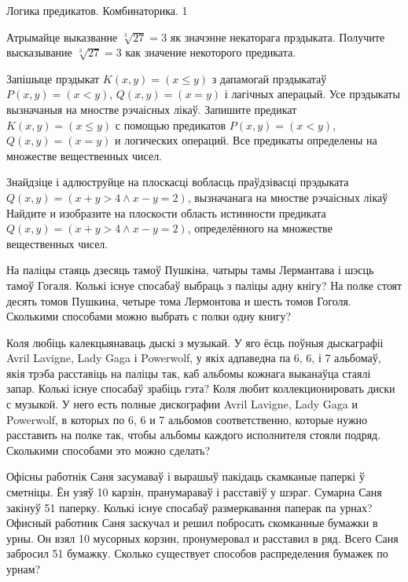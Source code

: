 



{Логика предикатов. Комбинаторика.}
{1}

\begin{problemList}

\problemItemSimple
{Атрымайце выказванне $\sqrt[3]{27} = 3$ як значэнне некаторага прэдыката.}
{Получите высказывание $\sqrt[3]{27} = 3$ как значение некоторого предиката.}

\bigskip

\problemItemSimple
{Запішыце прэдыкат $K(x, y) = (x \le y)$ з дапамогай прэдыкатаў $P(x, y) = (x < y)$, $Q(x, y) = (x = y)$ і лагічных аперацый.
Усе прэдыкаты вызначаныя на мностве рэчаісных лікаў. }
{Запишите предикат $K(x, y) = (x \le y)$ с помощью предикатов $P(x, y) = (x < y)$, $Q(x, y) = (x = y)$ и логических операций.
Все предикаты определены на множестве вещественных чисел.}

\bigskip

\problemItemSimple
{Знайдзіце і адлюструйце на плоскасці вобласць праўдзівасці прэдыката $Q(x, y) = (x + y > 4 \wedge x - y = 2)$, вызначанага на мностве рэчаісных лікаў}
{Найдите и изобразите на плоскости область истинности предиката $Q(x, y) = (x + y > 4 \wedge x - y = 2)$, определённого на множестве вещественных чисел.}

\bigskip

\problemItemSimple
{На паліцы стаяць дзесяць тамоў Пушкіна, чатыры тамы Лермантава і шэсць тамоў Гогаля.
Колькі існуе спосабаў выбраць з паліцы адну кнігу?}
{На полке стоят десять томов Пушкина, четыре тома Лермонтова и шесть томов Гоголя.
Сколькими способами можно выбрать с полки одну книгу?}

\bigskip

\problemItemSimple
{Коля любіць калекцыянаваць дыскі з музыкай.
У яго ёсць поўныя дыскаграфіі Avril Lavigne, Lady Gaga і Powerwolf, у якіх адпаведна па 6, 6, і 7 альбомаў,
якія трэба расставіць на паліцы так, каб альбомы кожнага выканаўца стаялі запар.
Колькі існуе спосабаў зрабіць гэта?}
{Коля любит коллекционировать диски с музыкой.
У него есть полные дискографии Avril Lavigne, Lady Gaga и Powerwolf, в которых по 6, 6 и 7 альбомов соответственно,
которые нужно расставить на полке так, чтобы альбомы каждого исполнителя стояли подряд.
Сколькими способами это можно сделать?}

\bigskip

\problemItemSimple
{Офісны работнік Саня засумаваў і вырашыў пакідаць скамканые паперкі ў сметніцы.
Ён узяў 10 карзін, пранумараваў і расставіў у шэраг.
Сумарна Саня закінуў 51 паперку. Колькі існуе спосабаў размеркавання паперак па урнах?}
{Офисный работник Саня заскучал и решил побросать скомканные бумажки в урны.
Он взял 10 мусорных корзин, пронумеровал и расставил в ряд.
Всего Саня забросил 51 бумажку. Сколько существует способов распределения бумажек по урнам?}


\end{problemList}
